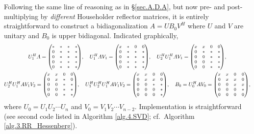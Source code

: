 \noindent Following the same line of reasoning as in \S \ref{sec.A.D.A}, but now pre- and post-multiplying by {\it different} Householder reflector matrices,
it is entirely straightforward to construct a bidiagonalization $A=U B_0 V^H$ where $U$ and $V$ are unitary and $B_0$ is upper bidiagonal.  
Indicated graphically, 
\begin{gather*}
  U^H_1 A = {\footnotesize\begin{pmatrix} * & * & * & * \\ 0 & * & * & * \\ 0 & * & * & * \\ 0 & * & * & * \\ 0 & * & * & * \end{pmatrix}}, \quad
  U^H_1 A V_1 = {\footnotesize\begin{pmatrix} x & * & 0 & 0 \\ 0 & * & * & * \\ 0 & * & * & * \\ 0 & * & * & * \\ 0 & * & * & * \end{pmatrix}}, \quad
  U^H_2 U^H_1 A V_1 = {\footnotesize\begin{pmatrix} x & x & 0 & 0 \\ 0 & * & * & * \\ 0 & 0 & * & * \\ 0 & 0 & * & * \\ 0 & 0 & * & * \end{pmatrix}}, \\
  U^H_2 U^H_1 A V_1 V_2 = {\footnotesize\begin{pmatrix} x & x & 0 & 0 \\ 0 & x & * & 0 \\ 0 & 0 & * & * \\ 0 & 0 & * & * \\ 0 & 0 & * & * \end{pmatrix}}, \quad
  U^H_3 U^H_2 U^H_1 A V_1 V_2 = {\footnotesize\begin{pmatrix} x & x & 0 & 0 \\ 0 & x & x & 0 \\ 0 & 0 & * & * \\ 0 & 0 & 0 & * \\ 0 & 0 & 0 & * \end{pmatrix}}, \quad
  B_0 = U^H_0 A V_0 = {\footnotesize\begin{pmatrix} x & x & 0 & 0 \\ 0 & x & x & 0 \\ 0 & 0 & x & x \\ 0 & 0 & 0 & * \\ 0 & 0 & 0 & 0 \end{pmatrix}},
\end{gather*}
where $U_0=U_1 U_2 \cdots U_n$ and $V_0=V_1 V_2\cdots V_{n-2}$.  Implementation is straightforward (see second code listed in Algorithm \ref{alg.4.SVD}; cf.~Algorithm \ref{alg.3.RR_Hessenberg}).

